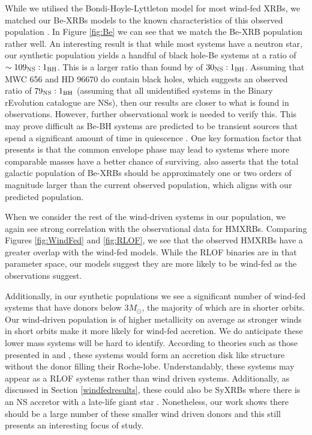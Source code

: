 \documentclass{pas}
\begin{document}
While we utilised the Bondi-Hoyle-Lyttleton model for most wind-fed XRBs, we matched our Be-XRBs models to the known characteristics of this observed population \citep{2024MNRAS.527.5023L,2025MNRAS.542.2087B}. In Figure \ref{fig:Be} we can see that we match the Be-XRB population rather well. An interesting result is that while most systems have a neutron star, our synthetic population yields a handful of black hole-Be systems at a ratio of $\sim109_{\rm{NS}}:1_{\rm{BH}}$. This is a larger ratio than found by \citet{LackofBeBH2009ApJ...707..870B} of $30_{\rm{NS}}:1_{\rm{BH}}$. Assuming that MWC 656 \citep{MWCXB2014ApJ...786L..11M} and HD 96670 \citep{HDisXB2021ApJ...913...48G} do contain black holes, which suggests an observed ratio of $79_{\rm{NS}}:1_{\rm{BH}}$ (assuming that all unidentified systems in the Binary rEvolution catalogue are NSs), then our results are closer to what is found in observations. However, further observational work is needed to verify this. This may prove difficult as Be-BH systems are predicted to be transient sources that spend a significant amount  of time in quiescence \citep{BePablo2011Ap&SS.332....1R}. One key formation factor that \citet{LackofBeBH2009ApJ...707..870B} presents is that the common envelope phase may lead to systems where more comparable masses have a better chance of surviving. \citet{LackofBeBH2009ApJ...707..870B} also asserts that the total galactic population of Be-XRBs should be approximately one or two orders of magnitude larger than the current observed population, which aligns with our predicted population.

When we consider the rest of the wind-driven systems in our population, we again see strong correlation with the observational data for HMXRBs. Comparing Figures \ref{fig:WindFed} and \ref{fig:RLOF}, we see that the observed HMXRBs have a greater overlap with the wind-fed models. While the RLOF binaries are in that parameter space, our models suggest they are more likely to be wind-fed as the observations suggest.

Additionally, in our synthetic populations we see a significant number of wind-fed systems that have donors below $3M_{\odot}$, the majority of which are in shorter orbits. Our wind-driven population is of higher metallicity on average as stronger winds in short orbits make it more likely for wind-fed accretion. We do anticipate these lower mass systems will be hard to identify. According to theories such as those presented in  \citet{1944MNRAS.104..273B} and \citet{1976ApJ...204..555S}, these systems would form an accretion disk like structure without the donor filling their Roche-lobe. Understandably, these systems may appear as a RLOF systems rather than wind driven systems. Additionally, as discussed in Section \ref{windfedresults}, these could also be SyXRBs where there is an NS accretor with a late-life giant star \citep{2012MNRAS.424.2265L,2019MNRAS.485..851Y}. Nonetheless, our work shows there should be a large number of these smaller wind driven donors and this still presents an interesting focus of study. 
\end{document}
